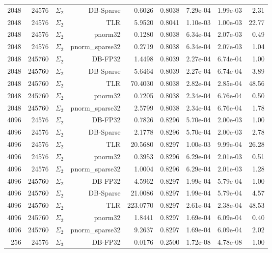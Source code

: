 \begin{tabular}{|r|r|r|r|r|r|r|r|r|}
  2048 & 24576 & $\Sigma_2$ & DB-Sparse & 0.6026 & 0.8038 & 7.29e-04 & 1.99e-03 & 2.31 \\
  2048 & 24576 & $\Sigma_2$ & TLR & 5.9520 & 0.8041 & 1.10e-03 & 1.00e-03 & 22.77 \\
  2048 & 24576 & $\Sigma_2$ & pnorm32 & 0.1280 & 0.8038 & 6.34e-04 & 2.07e-03 & 0.49 \\
  2048 & 24576 & $\Sigma_2$ & pnorm\_sparse32 & 0.2719 & 0.8038 & 6.34e-04 & 2.07e-03 & 1.04 \\
  2048 & 245760 & $\Sigma_2$ & DB-FP32 & 1.4498 & 0.8039 & 2.27e-04 & 6.74e-04 & 1.00 \\
  2048 & 245760 & $\Sigma_2$ & DB-Sparse & 5.6464 & 0.8039 & 2.27e-04 & 6.74e-04 & 3.89 \\
  2048 & 245760 & $\Sigma_2$ & TLR & 70.4030 & 0.8038 & 2.82e-04 & 2.85e-04 & 48.56 \\
  2048 & 245760 & $\Sigma_2$ & pnorm32 & 0.7205 & 0.8038 & 2.34e-04 & 6.76e-04 & 0.50 \\
  2048 & 245760 & $\Sigma_2$ & pnorm\_sparse32 & 2.5799 & 0.8038 & 2.34e-04 & 6.76e-04 & 1.78 \\
  4096 & 24576 & $\Sigma_2$ & DB-FP32 & 0.7826 & 0.8296 & 5.70e-04 & 2.00e-03 & 1.00 \\
  4096 & 24576 & $\Sigma_2$ & DB-Sparse & 2.1778 & 0.8296 & 5.70e-04 & 2.00e-03 & 2.78 \\
  4096 & 24576 & $\Sigma_2$ & TLR & 20.5680 & 0.8297 & 1.00e-03 & 9.99e-04 & 26.28 \\
  4096 & 24576 & $\Sigma_2$ & pnorm32 & 0.3953 & 0.8296 & 6.29e-04 & 2.01e-03 & 0.51 \\
  4096 & 24576 & $\Sigma_2$ & pnorm\_sparse32 & 1.0004 & 0.8296 & 6.29e-04 & 2.01e-03 & 1.28 \\
  4096 & 245760 & $\Sigma_2$ & DB-FP32 & 4.5962 & 0.8297 & 1.99e-04 & 5.79e-04 & 1.00 \\
  4096 & 245760 & $\Sigma_2$ & DB-Sparse & 21.0086 & 0.8297 & 1.99e-04 & 5.79e-04 & 4.57 \\
  4096 & 245760 & $\Sigma_2$ & TLR & 223.0770 & 0.8297 & 2.61e-04 & 2.38e-04 & 48.53 \\
  4096 & 245760 & $\Sigma_2$ & pnorm32 & 1.8441 & 0.8297 & 1.69e-04 & 6.09e-04 & 0.40 \\
  4096 & 245760 & $\Sigma_2$ & pnorm\_sparse32 & 9.2637 & 0.8297 & 1.69e-04 & 6.09e-04 & 2.02 \\
  256 & 24576 & $\Sigma_3$ & DB-FP32 & 0.0176 & 0.2500 & 1.72e-08 & 4.78e-08 & 1.00 \\

\end{tabular}

